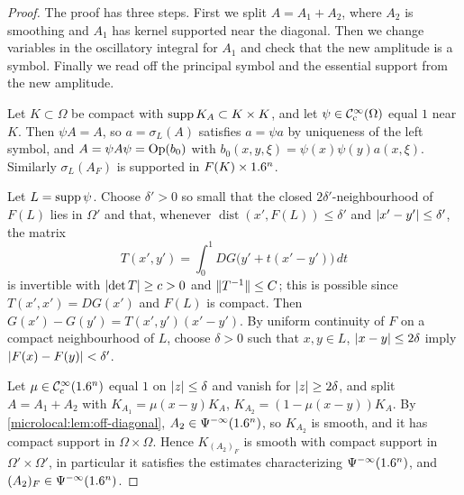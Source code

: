 \begin{proof}
  The proof has three steps. First we split $A=A_1+A_2$, where $A_2$ is
  smoothing and $A_1$ has kernel supported near the diagonal. Then we change
  variables in the oscillatory integral for $A_1$ and check that the new
  amplitude is a symbol. Finally we read off the principal symbol and the
  essential support from the new amplitude.

  Let $K\subset\Omega$ be compact with $\operatorname{supp} K_A\subset K\times K$, and let
  $\psi\in\mathcal{C}^\infty_{\mathrm{c}}(\Omega)$ equal $1$ near $K$. Then $\psi A=A$, so
  $a=\sigma_L(A)$ satisfies $a=\psi a$ by uniqueness of the left symbol, and
  $A=\psi A\psi=\operatorname{Op}(b_0)$ with $b_0(x,y,\xi)=\psi(x)\psi(y)a(x,\xi)$.
  Similarly $\sigma_L(A_F)$ is supported in $F(K)\times1.6^n$.

  Let $L=\operatorname{supp}\psi$. Choose $\delta'>0$ so small that the closed
  $2\delta'$-neighbourhood of $F(L)$ lies in $\Omega'$ and that, whenever
  $\operatorname{dist}(x',F(L))\le\delta'$ and $\lvert x'-y'\rvert\le\delta'$, the matrix
  \begin{equation*}
    T(x',y')=\int_0^1DG\bigl(y'+t(x'-y')\bigr)\,dt
  \end{equation*}
  is invertible with $\lvert \det T\rvert\ge c>0$ and $\lVert T^{-1}\rVert\le C$; this is
  possible since $T(x',x')=DG(x')$ and $F(L)$ is compact. Then
  $G(x')-G(y')=T(x',y')(x'-y')$. By uniform continuity of $F$ on a compact
  neighbourhood of $L$, choose $\delta>0$ such that $x,y\in L$,
  $\lvert x-y\rvert\le2\delta$ imply $\lvert F(x)-F(y)\rvert<\delta'$.

  Let $\mu\in\mathcal{C}^\infty_{\mathrm{c}}(1.6^n)$ equal $1$ on $\lvert z\rvert\le\delta$ and vanish for
  $\lvert z\rvert\ge2\delta$, and split $A=A_1+A_2$ with
  $K_{A_1}=\mu(x-y)K_A$, $K_{A_2}=(1-\mu(x-y))K_A$. By
  \cref{microlocal:lem:off-diagonal}, $A_2\in\Psi^{-\infty}(1.6^n)$, so
  $K_{A_2}$ is smooth, and it has compact support in $\Omega\times\Omega$.
  Hence $K_{(A_2)_F}$ is smooth with compact support in $\Omega'\times\Omega'$,
  in particular it satisfies the estimates characterizing
  $\Psi^{-\infty}(1.6^n)$, and $(A_2)_F\in\Psi^{-\infty}(1.6^n)$.


\end{proof}
